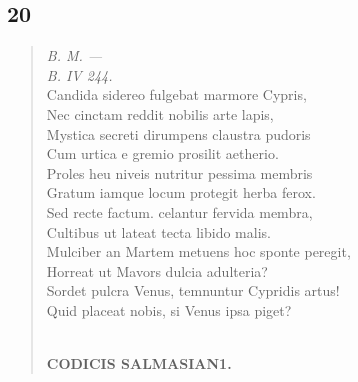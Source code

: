 \documentclass[11pt, a4paper]{report}
\begin{document}
            \subsection*{20}
      \begin{verse}
      \textit{B. M. —} \\ \textit{B. IV 244.} \\ Candida sidereo fulgebat marmore Cypris, \\ Nec cinctam reddit nobilis arte lapis, \\ Mystica secreti dirumpens claustra pudoris \\ Cum urtica  \lbrack e \rbrack  gremio prosilit aetherio. \\ Proles heu niveis nutritur pessima membris \\ Gratum iamque locum protegit herba ferox. \\ Sed recte factum. celantur fervida membra, \\ Cultibus ut lateat tecta libido malis. \\ Mulciber an Martem metuens hoc sponte peregit, \\ Horreat ut Mavors dulcia adulteria? \\ Sordet pulcra Venus, temnuntur Cypridis artus! \\ Quid placeat nobis, si Venus ipsa piget? \\ 
        ﻿\pagebreak 
    \begin{center} \textbf{CODICIS SALMASIAN1.} \end{center} \marginpar{[85]} 
      \end{verse}
  
\end{document}
